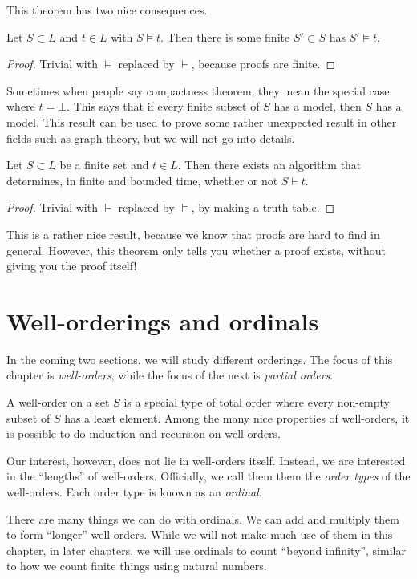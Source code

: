 \documentclass[a4paper]{article}
\begin{document}
This theorem has two nice consequences.
\begin{cor}
  Let $S\subset L$ and $t\in L$ with $S\models t$. Then there is some finite $S'\subset S$ has $S'\models t$.
\end{cor}

\begin{proof}
  Trivial with $\models$ replaced by $\vdash$, because proofs are finite.
\end{proof}
Sometimes when people say compactness theorem, they mean the special case where $t = \bot$. This says that if every finite subset of $S$ has a model, then $S$ has a model. This result can be used to prove some rather unexpected result in other fields such as graph theory, but we will not go into details.

\begin{cor}
  Let $S\subset L$ be a finite set and $t\in L$. Then there exists an algorithm that determines, in finite and bounded time, whether or not $S\vdash t$.
\end{cor}
\begin{proof}
  Trivial with $\vdash$ replaced by $\models$, by making a truth table.
\end{proof}
This is a rather nice result, because we know that proofs are hard to find in general. However, this theorem only tells you whether a proof exists, without giving you the proof itself!

\section{Well-orderings and ordinals}
In the coming two sections, we will study different orderings. The focus of this chapter is \emph{well-orders}, while the focus of the next is \emph{partial orders}.

A well-order on a set $S$ is a special type of total order where every non-empty subset of $S$ has a least element. Among the many nice properties of well-orders, it is possible to do induction and recursion on well-orders.

Our interest, however, does not lie in well-orders itself. Instead, we are interested in the ``lengths'' of well-orders. Officially, we call them them the \emph{order types} of the well-orders. Each order type is known as an \emph{ordinal}.

There are many things we can do with ordinals. We can add and multiply them to form ``longer'' well-orders. While we will not make much use of them in this chapter, in later chapters, we will use ordinals to count ``beyond infinity'', similar to how we count finite things using natural numbers.
\end{document}
